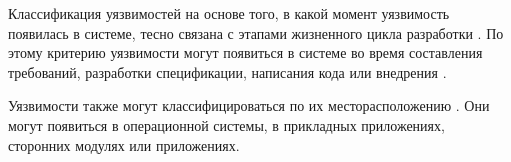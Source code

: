 \Sentence
Классификация уязвимостей на основе того, в какой момент уязвимость появилась в системе, тесно 
связана с этапами жизненного цикла разработки . 
\Sentence
По этому критерию уязвимости могут появиться в системе во время составления требований, разработки 
спецификации, написания кода или внедрения  . 

\Sentence
Уязвимости также могут классифицироваться по их месторасположению . 
\Sentence
Они могут появиться в  операционной системы, в прикладных приложениях, 
сторонних модулях или приложениях. 


